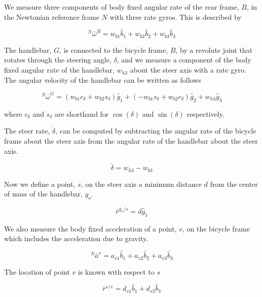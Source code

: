 \documentclass[a4paper]{article}
\begin{document}
We measure three components of body fixed angular rate of the rear frame, $B$,
in the Newtonian reference frame $N$ with three rate gyros. This is described
by

\begin{equation} ^N\bar{\omega}^B = w_{b1}\hat{b}_1 + w_{b2}\hat{b}_2 +
  w_{b3}\hat{b}_3
  \label{eq:rear-frame-angular-rate}
\end{equation}

The handlebar, $G$, is connected to the bicycle frame, $B$, by a revolute joint
that rotates through the steering angle, $\delta$, and we measure a component
of the body fixed angular rate of the handlebar, $w_{h3}$ about the steer axis
with a rate gyro. The angular velocity of the handlebar can be written as
follows

\begin{equation}
  ^N\bar{\omega}^G = (w_{b1}c_\delta + w_{b2}s_\delta)\hat{g}_1 +
  (-w_{b1}s_\delta + w_{b2}c_\delta)\hat{g}_2 +
  w_{h3}\hat{g}_3
\end{equation}

where $c_\delta$ and $s_\delta$ are shorthand for $\operatorname{cos}(\delta)$
and $\operatorname{sin}(\delta)$ respectively.

The steer rate, $\dot{\delta}$, can be computed by subtracting the angular rate
of the bicycle frame about the steer axis from the angular rate of the
handlebar about the steer axis.

\begin{equation}
  \dot{\delta} = w_{h3} - w_{b3}
\end{equation}

Now we define a point, $s$, on the steer axis a minimum distance $d$ from the
center of mass of the handlebar, $g_o$.

\begin{equation}
  \bar{r}^{g_o/s} = d\hat{g}_1
\end{equation}

We also measure the body fixed acceleration of a point, $v$, on the bicycle
frame which includes the acceleration due to gravity.

\begin{equation}
  ^N\bar{a}^v = a_{v1}\hat{b}_1 + a_{v2}\hat{b}_2 + a_{v3}\hat{b}_3
\end{equation}

The location of point $v$ is known with respect to $s$

\begin{equation}
  \bar{r}^{s/v} = d_{s1}\hat{b}_1 + d_{s3}\hat{b}_3
\end{equation}
\end{document}
